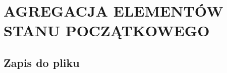 \chapter{AGREGACJA ELEMENTÓW STANU POCZĄTKOWEGO}
\label{chpt:agregacja-elementów-stanu-początkowego}
\section{Zapis do pliku}
